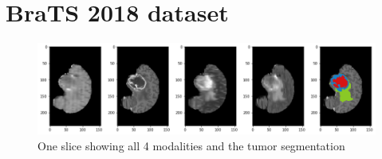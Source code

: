 \section{BraTS 2018 dataset}

\begin{figure}[H]
\centering
\caption{One slice showing all 4 modalities and the tumor segmentation}
\includegraphics[width=14cm]{chapters/04_segmentation/images/brats.png}
\end{figure}
